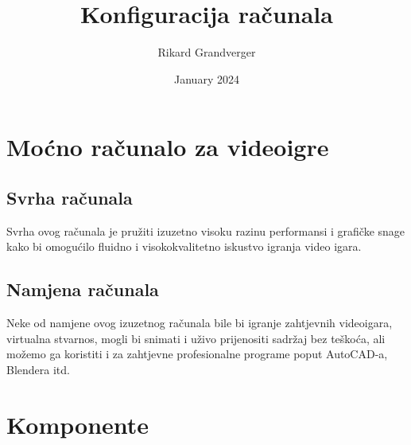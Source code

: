 \documentclass{report}
\title{Konfiguracija računala}
\author{Rikard Grandverger}
\date{January 2024}
\begin{document}
\maketitle
\tableofcontents
\listoffigures

\pagebreak

\chapter{Moćno računalo za videoigre}

\section{Svrha računala}
Svrha ovog računala je pružiti izuzetno visoku razinu performansi i grafičke snage kako bi omogućilo fluidno i visokokvalitetno iskustvo igranja video igara.

\section{Namjena računala}
Neke od namjene ovog izuzetnog računala bile bi igranje zahtjevnih videoigara, virtualna stvarnos, mogli bi snimati i uživo prijenositi sadržaj bez teškoća, ali možemo ga koristiti i za zahtjevne profesionalne programe poput AutoCAD-a, Blendera itd.

\pagebreak

\chapter{Komponente}
\end{document}
